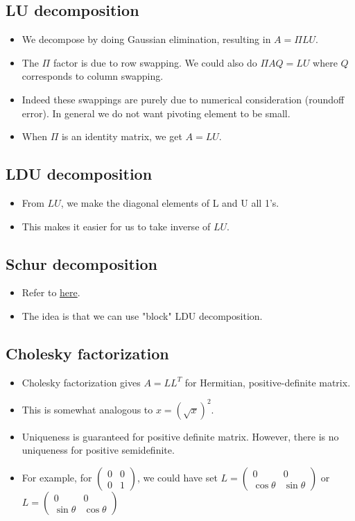 \documentclass[11pt,reqno]{amsart}
\theoremstyle{remark}
\begin{document}
\subsection{LU decomposition}
\begin{itemize}
\item We decompose by doing Gaussian elimination, resulting in $A=\Pi LU$.
\item The $\Pi$ factor is due to row swapping. We could also do $\Pi AQ=LU$ where $Q$ corresponds to column swapping.
\item Indeed these swappings are purely due to numerical consideration (roundoff error). In general we do not want pivoting element to be small.
\item When $\Pi$ is an identity matrix, we get $A=LU$.
\end{itemize}
\subsection{LDU decomposition}
\begin{itemize}
\item From $LU$, we make the diagonal elements of L and U all 1's. 
\item This makes it easier for us to take inverse of $LU$. 
\end{itemize}

\subsection{Schur decomposition}
\begin{itemize}
\item Refer to \href{https://en.wikipedia.org/wiki/Schur_complement}{here}.
\item The idea is that we can use "block" LDU decomposition.
\end{itemize}

\subsection{Cholesky factorization}
\begin{itemize}
\item Cholesky factorization gives $A=LL^T$ for Hermitian, positive-definite matrix.
\item This is somewhat analogous to $x=(\sqrt x)^2$.
\item Uniqueness is guaranteed for positive definite matrix. However, there is no uniqueness for positive semidefinite.
\item For example, for $
\begin{pmatrix}
0 & 0 \\ 0 & 1
\end{pmatrix}$, we could have set $L=\begin{pmatrix}
  0 & 0 \\ \cos\theta & \sin\theta
\end{pmatrix}
  $ or $L=\begin{pmatrix}
    0 & 0 \\ \sin\theta & \cos\theta
  \end{pmatrix}$
\end{itemize}
\end{document}
